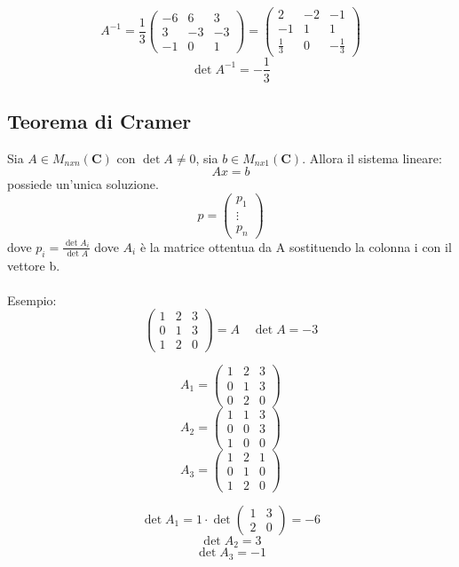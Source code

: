 \documentclass[12pt]{article}
\begin{document}
\[A^{-1} = \frac{1}{3} \begin{pmatrix}
    -6 & 6 & 3\\
    3 & -3 & -3\\
    -1 & 0 & 1
\end{pmatrix} =
\begin{pmatrix}
    2 & -2 & -1\\
    -1 & 1 & 1\\
    \frac{1}{3} & 0 & -\frac{1}{3}
\end{pmatrix}
\]
\[\det{A^{-1}} = -\frac{1}{3}\]

\subsection{Teorema di Cramer}

Sia $A \in M_{nxn} (\mathbf{C})$ con $\det{A} \neq 0$, sia $b \in M_{nx1} (\mathbf{C})$. Allora il sistema lineare:
\[Ax = b\]
possiede un'unica soluzione.
\[p = \begin{pmatrix}
    p_1\\
    \vdots\\
    p_n
\end{pmatrix}\]
dove $p_i = \frac{\det{A_i}}{\det{A}}$ dove $A_i$ è la matrice ottentua da A sostituendo la colonna i con il vettore b.
\\\\
Esempio:
\[\begin{pmatrix}
    1 & 2 & 3\\
    0 & 1 & 3\\
    1 & 2 & 0
\end{pmatrix} = A \quad \det{A} = -3\]

\[A_1 = \begin{pmatrix}
    1 & 2 & 3\\
    0 & 1 & 3\\
    0 & 2 & 0
\end{pmatrix}\]
\[A_2 = \begin{pmatrix}
    1 & 1 & 3\\
    0 & 0 & 3\\
    1 & 0 & 0
\end{pmatrix}\]
\[A_3 = \begin{pmatrix}
    1 & 2 & 1\\
    0 & 1 & 0\\
    1 & 2 & 0
\end{pmatrix}\]

\[\det{A_1} = 1 \cdot \det{\begin{pmatrix}
    1 & 3\\
    2 & 0
\end{pmatrix}} = -6\]
\[\det{A_2} = 3\]
\[\det{A_3} = -1\]
\end{document}
